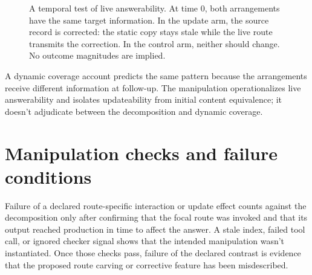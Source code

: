 \documentclass[12pt]{article}
\begin{document}
\begin{figure}[H]
\centering
{}
\caption{A temporal test of live answerability. At time 0, both arrangements have the same
target information. In the update arm, the source record is corrected: the static copy
stays stale while the live route transmits the correction. In the control arm, neither
should change. No outcome magnitudes are implied.}\label{fig:design-supplement}
\end{figure}

A dynamic coverage account predicts the same pattern because the arrangements receive
different information at follow-up. The manipulation operationalizes live answerability and
isolates updateability from initial content equivalence; it doesn't adjudicate between the
decomposition and dynamic coverage.

\section{Manipulation checks and failure conditions}

Failure of a declared route-specific interaction or update effect counts against the
decomposition only after confirming that the focal route was invoked and that its output
reached production in time to affect the answer. A stale index, failed tool call, or ignored
checker signal shows that the intended manipulation wasn't instantiated. Once those checks
pass, failure of the declared contrast is evidence that the proposed route carving or
corrective feature has been misdescribed.

\printbibliography
\end{document}
